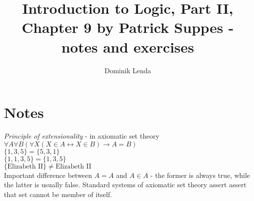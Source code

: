 \documentclass{article}
\title{Introduction to Logic, Part II, Chapter 9 by Patrick Suppes - notes and exercises}
\author{Dominik Lenda}
\begin{document}
\maketitle

\section{Notes}
\emph{Principle of extensionality} - in axiomatic set theory\\
\smallskip
$\forall A \forall B (\forall X (X \in A \leftrightarrow X \in B) \rightarrow A = B)$\\
\smallskip
$\{1, 3, 5\} = \{5, 3, 1\}$\\
\smallskip
$\{1, 1, 3, 5\} = \{1, 3, 5\}$\\
\smallskip
$\{\text{Elizabeth II}\} \neq \text{Elizabeth II}$\\
Important difference between $A = A$ and $A \in A$ - the former is always true, while the latter is usually false. Standard systems of axiomatic set theory assert assert that set cannot be member of itself.
\smallskip
\end{document}

